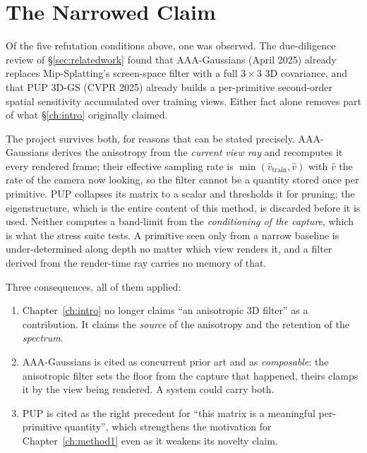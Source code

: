\section{The Narrowed Claim}
\label{sec:narrowing}

Of the five refutation conditions above, one was observed. The due-diligence
review of \S\ref{sec:relatedwork} found that AAA-Gaussians (April 2025) already
replaces Mip-Splatting's screen-space filter with a full $3\times3$ 3D
covariance, and that PUP 3D-GS (CVPR 2025) already builds a per-primitive
second-order spatial sensitivity accumulated over training views. Either fact
alone removes part of what \S\ref{ch:intro} originally claimed.

The project survives both, for reasons that can be stated precisely. AAA-Gaussians derives the anisotropy from the
\emph{current view ray} and recomputes it every rendered frame; their effective
sampling rate is $\min(\hat v_{\mathrm{train}}, \hat v)$ with $\hat v$ the rate
of the camera now looking, so the filter cannot be a quantity stored once per
primitive. PUP collapses its matrix to a scalar and thresholds it for pruning;
the eigenstructure, which is the entire content of this method, is discarded
before it is used. Neither computes a band-limit from the \emph{conditioning of the
capture}, which is what the stress suite tests. A primitive seen only from a
narrow baseline is under-determined along depth no matter which view renders it,
and a filter derived from the render-time ray carries no memory of that.

Three consequences, all of them applied:

\begin{enumerate}[leftmargin=1.4em,itemsep=3pt]
  \item Chapter~\ref{ch:intro} no longer claims ``an anisotropic 3D filter'' as a
        contribution. It claims the \emph{source} of the anisotropy and the
        retention of the \emph{spectrum}.
  \item AAA-Gaussians is cited as concurrent prior art and as \emph{composable}:
        the anisotropic filter sets the floor from the capture that happened, theirs clamps it by the
        view being rendered. A system could carry both.
  \item PUP is cited as the right precedent for ``this matrix is a meaningful
        per-primitive quantity'', which strengthens the motivation for
        Chapter~\ref{ch:method1} even as it weakens its novelty claim.
\end{enumerate}

